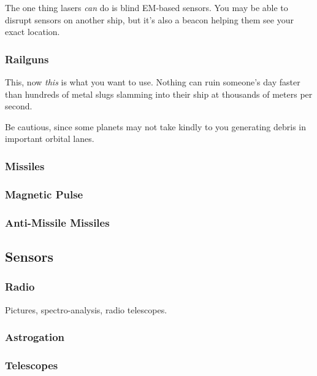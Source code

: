\par
The one thing lasers \textit{can} do is blind EM-based sensors. You may be able to disrupt sensors on another ship, but it's also a beacon helping them see your exact location.


\subsubsection{Railguns}
\par
This, now \textit{this} is what you want to use. Nothing can ruin someone's day faster than hundreds of metal slugs slamming into their ship at thousands of meters per second.

\par
Be cautious, since some planets may not take kindly to you generating debris in important orbital lanes.


\subsubsection{Missiles}


\subsubsection{Magnetic Pulse}


\subsubsection{Anti-Missile Missiles}

\subsection{Sensors}

\subsubsection{Radio}
Pictures, spectro-analysis, radio telescopes.

\subsubsection{Astrogation}

\subsubsection{Telescopes}

